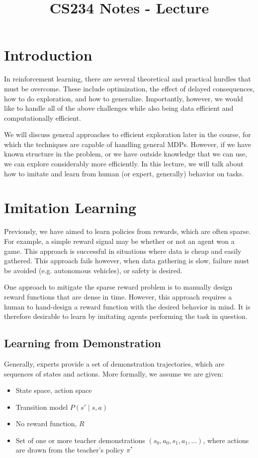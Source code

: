 \documentclass{article}
\title{CS234 Notes - Lecture \lecturenum \\ \lecturetitle }
\author{ \lecturescribe }
\begin{document}
\maketitle

\section{Introduction}

In reinforcement learning, there are several theoretical and practical hurdles that must be overcome. These include optimization, the effect of delayed consequences, how to do exploration, and how to generalize. Importantly, however, we would like to handle all of the above challenges while also being data efficient and computationally efficient.

We will discuss general approaches to efficient exploration later in the course, for which the techniques are capable of handling general MDPs. However, if we have known structure in the problem, or we have outside knowledge that we can use, we can explore considerably more efficiently. In this lecture, we will talk about how to imitate and learn from human (or expert, generally) behavior on tasks.

\section{Imitation Learning}

Previously, we have aimed to learn policies from rewards, which are often sparse. For example, a simple reward signal may be whether or not an agent won a game. This approach is successful in situations where data is cheap and easily gathered. This approach fails however, when data gathering is slow, failure must be avoided (e.g. autonomous vehicles), or safety is desired.

One approach to mitigate the sparse reward problem is to manually design reward functions that are dense in time. However, this approach requires a human to hand-design a reward function with the desired behavior in mind. It is therefore desirable to learn by imitating agents performing the task in question.

\subsection{Learning from Demonstration}

Generally, experts provide a set of demonstration trajectories, which are sequences of states and actions. More formally, we assume we are given:
\begin{itemize}
    \item State space, action space
    \item Transition model $P(s' \mid s,a)$
    \item No reward function, $R$
    \item Set of one or more teacher demonstrations $(s_0, a_0, s_1, a_1, \ldots)$, where actions are drawn from the teacher's policy $\pi^*$
\end{itemize}
\end{document}
